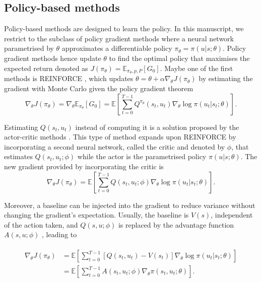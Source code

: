 \subsection{Policy-based methods} \label{sec:ch2_policy_based_methods}
Policy-based methods are designed to learn the policy.
In this manuscript, we restrict to the subclass of policy gradient methods where a neural network parametrised by $\theta$ approximates a differentiable policy $\pi_\theta=\pi(u|s;\theta)$.
Policy gradient methods hence update $\theta$ to find the optimal policy that maximises the expected return denoted as  $J(\pi_\theta) = \mathbb{E}_{\pi_\theta, p, P}[G_0]$.
Maybe one of the first methods is REINFORCE \citep{williams1992simple}, which updates $\theta = \theta + \alpha \nabla_\theta J(\pi_\theta)$ by estimating the gradient with Monte Carlo given the policy gradient theorem \citep{sutton1999policy} 
\begin{equation}
\label{eq:ch2_reinforce_grad}
    \nabla_\theta J(\pi_\theta) = \nabla_\theta \mathbb{E}_{\pi_\theta}[G_0] = \mathbb{E}\left[\sum_{t=0}^{T-1} Q^{\pi_\theta}(s_t, u_t) \nabla_\theta \log \pi(u_t|s_t;\theta)\right].
\end{equation}

Estimating $Q(s_t, u_t)$ instead of computing it is a solution proposed by the actor-critic methods \citep{sutton1999policy,konda1999actor}.
This type of method expands upon REINFORCE by incorporating a second neural network, called the critic and denoted by $\phi$, that estimates $Q(s_t, u_t;\phi)$ while the actor is the parametrised policy $\pi(u|s;\theta)$.
The new gradient provided by incorporating the critic is
\begin{equation}
\label{eq:ch2_Q_actor_crit}
    \nabla_\theta J(\pi_\theta) = \mathbb{E}\left[\sum_{t=0}^{T-1} Q(s_t, u_t;\phi) \nabla_\theta \log \pi(u_t|s_t;\theta)\right].
\end{equation}

Moreover, a baseline can be injected into the gradient to reduce variance without changing the gradient's expectation.
Usually, the baseline is  $V(s)$, independent of the action taken, and $Q(s, u;\phi)$ is replaced by the advantage function $A(s,u; \phi)$ \citep{10.5555/2074022.2074088}, leading to

\begin{align}
\begin{split}
\label{eq:ch2_baseline_actor_crit}
    \nabla_\theta J(\pi_\theta)
    & = \mathbb{E}\left[\sum_{t=0}^{T-1} [Q(s_t, u_t) - V(s_t)] \nabla_\theta \log \pi(u_t|s_t;\theta)\right]\\
    & = \mathbb{E} \left[\sum_{t=0}^{T-1} A(s_t, u_t; \phi) \nabla_\theta \pi(s_t, u_t; \theta)\right].
\end{split}
\end{align}

